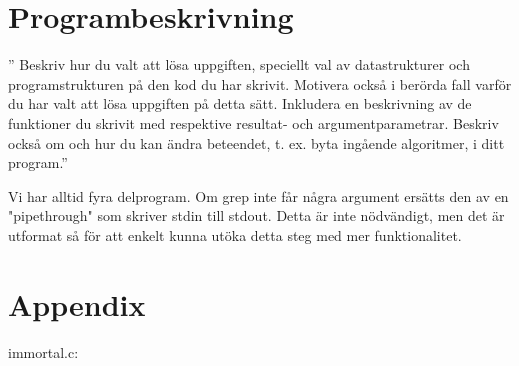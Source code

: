 \documentclass[paper=a4, fontsize=11pt]{scrartcl} %
\numberwithin{equation}{section} %
\numberwithin{figure}{section} %
\numberwithin{table}{section} %
\begin{document}
\section{Programbeskrivning}

'' Beskriv hur du valt att lösa uppgiften, speciellt val av datastrukturer och programstrukturen på den kod du har skrivit. Motivera också i berörda fall varför du har valt att lösa uppgiften på detta sätt. Inkludera en beskrivning av de funktioner du skrivit med respektive resultat- och argumentparametrar. Beskriv också om och hur du kan ändra beteendet, t. ex. byta ingående algoritmer, i ditt program.''

Vi har alltid fyra delprogram. Om grep inte får några argument ersätts den av 
en "pipethrough" som skriver stdin till stdout. Detta är inte nödvändigt, men
det är utformat så för att enkelt kunna utöka detta steg med mer funktionalitet.







\newpage
\section*{Appendix}
immortal.c:\\
\end{document}
